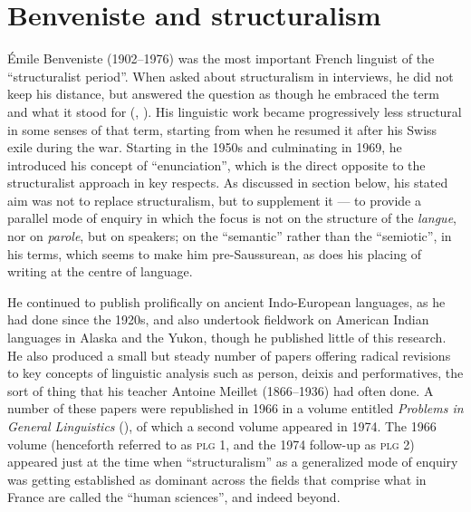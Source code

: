 \documentclass[output=paper]{langscibook}
\begin{document}
\section{Benveniste and structuralism}
\label{sec:joseph:bevenistestructuralism}

Émile Benveniste (1902--1976) was the most important French linguist of the ``structuralist period''. When asked about structuralism in interviews, he did not keep his distance, but answered the question as though he embraced the term and what it stood for (\citealt{Benveniste1968langage}, \citealt{Benveniste1968structuralisme}). His linguistic work became progressively less structural in some senses of that term, starting from when he resumed it after his Swiss exile during the war. Starting in the 1950s and culminating in 1969, he introduced his concept of ``enunciation'', which is the direct opposite to the structuralist approach in key respects. As discussed in section  below, his stated aim was not to replace structuralism, but to supplement it — to provide a parallel mode of enquiry in which the focus is not on the structure of the \emph{langue}, nor on \emph{parole}, but on speakers; on the ``semantic'' rather than the ``semiotic'', in his terms, which seems to make him pre-Saussurean, as does his placing of writing at the centre of language.

He continued to publish prolifically on ancient Indo-European languages, as he had done since the 1920s, and also undertook fieldwork on American Indian languages in Alaska and the Yukon, though he published little of this research. He also produced a small but steady number of papers offering radical revisions to key concepts of linguistic analysis such as person, deixis and performatives, the sort of thing that his teacher Antoine Meillet (1866--1936) had often done. A number of these papers were republished in 1966 in a volume entitled \emph{Problems in General Linguistics} (\citeyear{Benveniste196674}), of which a second volume appeared in 1974. The 1966 volume (henceforth referred to as \textsc{plg 1}, and the 1974 follow-up as \textsc{plg 2}) appeared just at the time when ``structuralism'' as a generalized mode of enquiry was getting established as dominant across the fields that comprise what in France are called the ``human sciences'', and indeed beyond.
\end{document}
